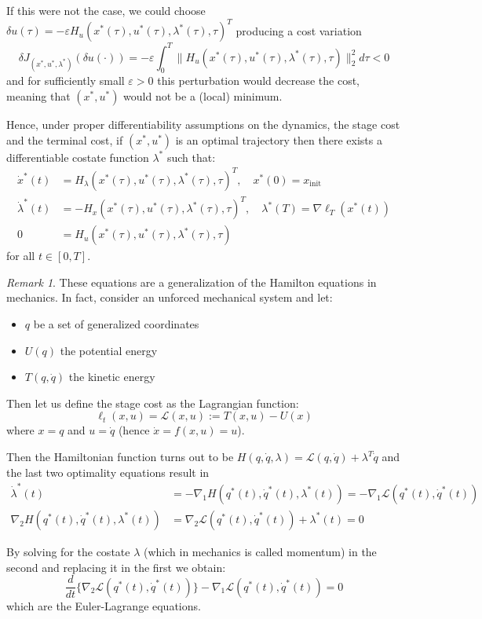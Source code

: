 \documentclass[openany]{book}
\theoremstyle{definition}
\theoremstyle{remark}
\newtheorem*{remark}{Remark}
\begin{document}
If this were not the case, we could choose $\delta u(\tau) = -\varepsilon H_u(x^*(\tau),u^*(\tau),\lambda^*(\tau),\tau)^T$ producing a cost variation
\[
    \delta J_{(x^*,u^*,\lambda^*)}(\delta u(\cdot)) = -\varepsilon \int_0^T \|H_u(x^*(\tau),u^*(\tau),\lambda^*(\tau),\tau)\|_2^2 d\tau < 0 \tag{1}
\]
and for sufficiently small $\varepsilon > 0$ this perturbation would decrease the cost, meaning that $(x^*,u^*)$ would not be a (local) minimum.

Hence, under proper differentiability assumptions on the dynamics, the stage cost and the terminal cost, if $(x^*,u^*)$ is an optimal trajectory then there exists a differentiable costate function $\lambda^*$ such that:
\begin{align*}
    \dot{x}^*(t) &= H_\lambda(x^*(\tau),u^*(\tau),\lambda^*(\tau),\tau)^T, \quad x^*(0) = x_{\text{init}}\\
    \dot{\lambda}^*(t) &= -H_x(x^*(\tau),u^*(\tau),\lambda^*(\tau),\tau)^T, \quad \lambda^*(T) = \nabla\ell_T(x^*(t))\\
    0 &= H_u(x^*(\tau),u^*(\tau),\lambda^*(\tau),\tau)
\end{align*}
for all $t \in [0,T]$.

\begin{remark}
These equations are a generalization of the Hamilton equations in mechanics. In fact, consider an unforced mechanical system and let:
\begin{itemize}
    \item $q$ be a set of generalized coordinates
    \item $U(q)$ the potential energy
    \item $T(q,\dot{q})$ the kinetic energy
\end{itemize}
Then let us define the stage cost as the Lagrangian function:
\[
    \ell_t(x,u) = \mathcal{L}(x,u) := T(x,u) - U(x)
\]
where $x = q$ and $u = \dot{q}$ (hence $\dot{x} = f(x,u) = u$).

Then the Hamiltonian function turns out to be $H(q,\dot{q},\lambda) = \mathcal{L}(q,\dot{q}) + \lambda^T\dot{q}$ and the last two optimality equations result in
\begin{align*}
    \dot{\lambda}^*(t) &= -\nabla_1H(q^*(t),\dot{q}^*(t),\lambda^*(t)) = -\nabla_1\mathcal{L}(q^*(t),\dot{q}^*(t))\\
    \nabla_2H(q^*(t),\dot{q}^*(t),\lambda^*(t)) &= \nabla_2\mathcal{L}(q^*(t),\dot{q}^*(t)) + \lambda^*(t) = 0
\end{align*}

By solving for the costate $\lambda$ (which in mechanics is called momentum) in the second and replacing it in the first we obtain:
\[
    \frac{d}{dt}\{\nabla_2\mathcal{L}(q^*(t),\dot{q}^*(t))\} - \nabla_1\mathcal{L}(q^*(t),\dot{q}^*(t)) = 0
\]
which are the Euler-Lagrange equations.
\end{remark}
\end{document}
